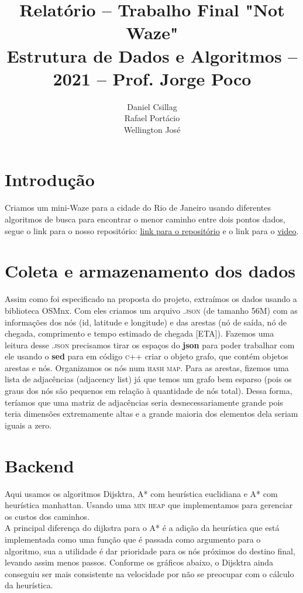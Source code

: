 \documentclass{article}
\title{Relatório -- Trabalho Final "Not Waze"\\
       \large Estrutura de Dados e Algoritmos -- 2021 -- Prof. Jorge Poco}
\author{Daniel Csillag \\ Rafael Portácio \\ Wellington José}
\begin{document}
\maketitle

\section{Introdução}
Criamos um mini-Waze para a cidade do Rio de Janeiro usando diferentes algoritmos de busca para encontrar o menor caminho entre dois pontos dados, segue o link para o nosso repositório: \href{https://github.com/EMAp-EDA-2021/final-project-grupo-12}{link para o repositório} e o link para o \href{https://drive.google.com/file/d/1q30WdzyVzDPUxwqeOWxns8QPEoYQ6cza/view?usp=sharing}{video}. 

\section{Coleta e armazenamento dos dados}

Assim como foi especificado na proposta do projeto, extraímos os dados usando a biblioteca OSMnx. Com eles criamos um arquivo \textsc{.json} (de tamanho 56M) com as informações dos nós (id, latitude e longitude) e das arestas (nó de saída, nó de chegada, comprimento e tempo estimado de chegada [ETA]). Fazemos uma leitura desse \textsc{.json} precisamos tirar os espaços do \textbf{json} para poder trabalhar com ele usando o \textbf{sed} para em código \textsc{c++} criar o objeto grafo, que contém objetos arestas e nós. Organizamos os nós num \textsc{hash map}. Para as arestas, fizemos uma lista de adjacências (adjacency list) já que temos um grafo bem esparso (pois os graus dos nós são pequenos em relação à quantidade de nós total). Dessa forma, teríamos que uma matriz de adjacências seria desnecessariamente grande pois teria dimensões extremamente altas e a grande maioria dos elementos dela seriam iguais a zero.

\section{Backend}

Aqui usamos os algoritmos Dijsktra, A* com heurística euclidiana e A* com heurística manhattan. Usando uma \textsc{min heap} que implementamos para gerenciar os custos dos caminhos. \\

A principal diferença do dijkstra para o A* é a adição da heurística que está implementada como uma função que é passada como argumento para o algoritmo, sua a utilidade é dar prioridade para os nós próximos do destino final, levando assim menos passos. Conforme os gráficos abaixo, o Dijsktra ainda conseguiu ser mais consistente na velocidade por não se preocupar com o cálculo da heurística.
\end{document}
